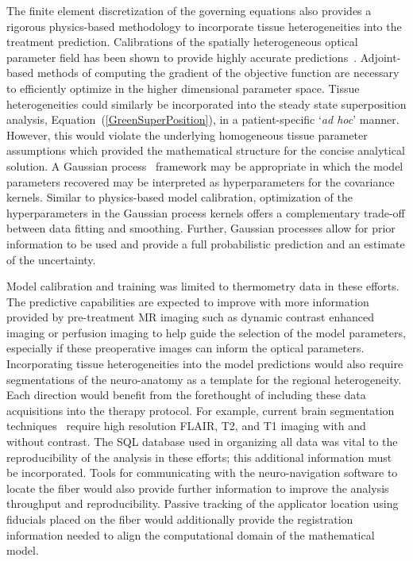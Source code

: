 \documentclass[12pt]{article}
\newcommand{\eqn}[1]{(\ref{#1})}
\begin{document}
The finite element discretization of the governing equations
also provides a rigorous physics-based methodology to 
incorporate tissue heterogeneities into the treatment prediction.
Calibrations of the spatially heterogeneous 
optical parameter field has been shown to provide highly accurate 
predictions~\cite{fuentes2013inverse}.
Adjoint-based methods of computing the gradient of the objective 
function are necessary to efficiently optimize in the higher dimensional parameter space.
Tissue heterogeneities could similarly be incorporated
into the steady state superposition analysis, Equation~\eqn{GreenSuperPosition}, in a patient-specific
`\textit{ad hoc}' manner. However, this would violate the underlying homogeneous
tissue parameter assumptions which provided the mathematical
structure for the concise analytical solution.
A Gaussian process~\cite{rasmussen2006gaussian,Constantinescu2013} 
framework may be appropriate
in which the model parameters recovered may be interpreted as hyperparameters
for the covariance kernels.
Similar to physics-based model calibration, optimization of the
hyperparameters in the Gaussian process kernels offers a complementary
trade-off between data fitting and smoothing. Further, Gaussian processes allow
for prior information to be used and provide a full probabilistic prediction
and an estimate of the uncertainty. 

Model calibration and training was limited to thermometry data in these efforts. 
The predictive capabilities are expected to improve with more information
provided by pre-treatment MR imaging such as dynamic contrast enhanced imaging
or perfusion imaging to help guide the selection of the model parameters,
especially if these preoperative images can inform the optical parameters.
Incorporating tissue heterogeneities into the model predictions would also
require segmentations of the neuro-anatomy as a template for the regional heterogeneity.
Each direction would benefit from the forethought of including these data
acquisitions into the therapy protocol. 
For example, current brain segmentation techniques~\cite{Menze2014} require high resolution
FLAIR, T2, and T1 imaging with and without contrast.
The SQL database used in organizing all data was vital to the reproducibility
of the analysis in these efforts; this additional information must be
incorporated.
Tools for communicating with the neuro-navigation software to locate the fiber
would also provide further information to improve the analysis throughput
and reproducibility.
Passive tracking of the applicator location using fiducials placed on the fiber
would additionally provide the registration information needed to align the
computational domain of the mathematical model. 
\end{document}
